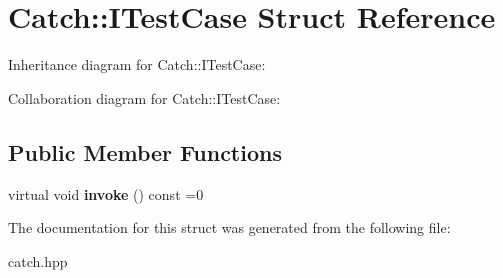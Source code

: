 \hypertarget{struct_catch_1_1_i_test_case}{}\section{Catch\+:\+:I\+Test\+Case Struct Reference}
\label{struct_catch_1_1_i_test_case}


Inheritance diagram for Catch\+:\+:I\+Test\+Case\+:


Collaboration diagram for Catch\+:\+:I\+Test\+Case\+:
\subsection*{Public Member Functions}
\begin{DoxyCompactItemize}
\item 
\mbox{\label{struct_catch_1_1_i_test_case_a678825e62e7c17297621cfeb65588c34}} 
virtual void {\bfseries invoke} () const =0
\end{DoxyCompactItemize}


The documentation for this struct was generated from the following file\+:\begin{DoxyCompactItemize}
\item 
catch.\+hpp\end{DoxyCompactItemize}
